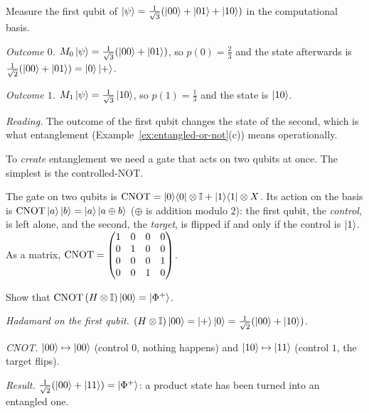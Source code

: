 \begin{example}\label{ex:partial2}
  Measure the first qubit of $\left|\psi\right\rangle=\frac1{\sqrt3}(\left|00\right\rangle+\left|01\right\rangle+\left|10\right\rangle)$ in the computational basis.
\end{example}
\begin{solution}
  \begin{steps}
    \item \emph{Outcome $0$.} $M_0\left|\psi\right\rangle=\frac1{\sqrt3}(\left|00\right\rangle+\left|01\right\rangle)$, so $p(0)=\tfrac23$ and the state afterwards is $\frac1{\sqrt2}(\left|00\right\rangle+\left|01\right\rangle)=\left|0\right\rangle\left|+\right\rangle$.
    \item \emph{Outcome $1$.} $M_1\left|\psi\right\rangle=\frac1{\sqrt3}\left|10\right\rangle$, so $p(1)=\tfrac13$ and the state is $\left|10\right\rangle$.
    \item \emph{Reading.} The outcome of the first qubit changes the state of the second, which is what entanglement (Example~\ref{ex:entangled-or-not}(c)) means operationally.
  \end{steps}
\end{solution}

To \emph{create} entanglement we need a gate that acts on two qubits at once. The simplest is the controlled-NOT.

\begin{definition}\label{def:cnot}
  The  gate on two qubits is $\mathrm{CNOT}=\left|0\right\rangle\!\left\langle0\right|\otimes\mathbb{I}+\left|1\right\rangle\!\left\langle1\right|\otimes X$. Its action on the basis is $\mathrm{CNOT}\left|a\right\rangle\left|b\right\rangle=\left|a\right\rangle\left|a\oplus b\right\rangle$ ($\oplus$ is addition modulo $2$): the first qubit, the \emph{control}, is left alone, and the second, the \emph{target}, is flipped if and only if the control is $\left|1\right\rangle$. As a matrix, $\mathrm{CNOT}=\begin{pmatrix}1&0&0&0\\0&1&0&0\\0&0&0&1\\0&0&1&0\end{pmatrix}$.
\end{definition}

\begin{example}\label{ex:bell-circuit}
  Show that $\mathrm{CNOT}\,(H\otimes\mathbb{I})\left|00\right\rangle=\left|\Phi^+\right\rangle$.
\end{example}
\begin{solution}
  \begin{steps}
    \item \emph{Hadamard on the first qubit.} $(H\otimes\mathbb{I})\left|00\right\rangle=\left|+\right\rangle\left|0\right\rangle=\tfrac1{\sqrt2}(\left|00\right\rangle+\left|10\right\rangle)$.
    \item \emph{CNOT.} $\left|00\right\rangle\mapsto\left|00\right\rangle$ (control $0$, nothing happens) and $\left|10\right\rangle\mapsto\left|11\right\rangle$ (control $1$, the target flips).
    \item \emph{Result.} $\tfrac1{\sqrt2}(\left|00\right\rangle+\left|11\right\rangle)=\left|\Phi^+\right\rangle$: a product state has been turned into an entangled one.
  \end{steps}
\end{solution}

